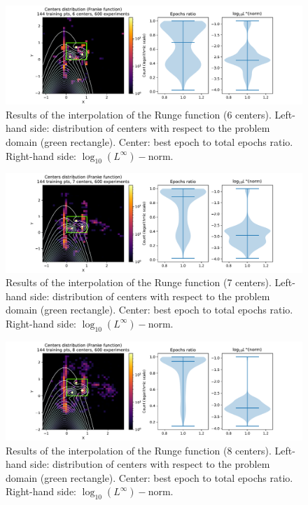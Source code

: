 \documentclass[12pt]{report} %
\begin{document}
\begin{figure}[H]
  \includegraphics[width=\textwidth, trim={2cm 0 2.8cm 0}, clip=true]{imagenes/experiments/2d/franke_interpolation/tr12_c6_franke.pdf}
  \caption{Results of the interpolation of the Runge function (6 centers). 
  Left-hand side: distribution of centers with respect to the problem domain (green rectangle). Center: best epoch to total epochs ratio.
  Right-hand side: $\log_{10}(L^\infty)-$norm.}
  \label{fig:franke-tr12-c6}
\end{figure}
\begin{figure}[H]
  \includegraphics[width=\textwidth, trim={2cm 0 2.8cm 0}, clip=true]{imagenes/experiments/2d/franke_interpolation/tr12_c7_franke.pdf}
  \caption{Results of the interpolation of the Runge function (7 centers). 
  Left-hand side: distribution of centers with respect to the problem domain (green rectangle). Center: best epoch to total epochs ratio.
  Right-hand side: $\log_{10}(L^\infty)-$norm.}
  \label{fig:franke-tr12-c7}
\end{figure}
\begin{figure}[H]
  \includegraphics[width=\textwidth, trim={2cm 0 2.8cm 0}, clip=true]{imagenes/experiments/2d/franke_interpolation/tr12_c8_franke.pdf}
  \caption{Results of the interpolation of the Runge function (8 centers). 
  Left-hand side: distribution of centers with respect to the problem domain (green rectangle). Center: best epoch to total epochs ratio.
  Right-hand side: $\log_{10}(L^\infty)-$norm.}
  \label{fig:franke-tr12-c8}
\end{figure}
\end{document}
